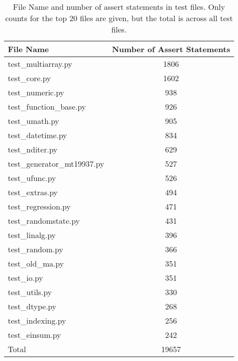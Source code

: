 \documentclass{article}
\begin{document}
\begin{table}[H]
\centering
    \begin{tabular}{lc}
        File Name & Number of Assert Statements\\\toprule
        test\_multiarray.py & 1806\\
        test\_core.py & 1602\\
        test\_numeric.py & 938\\
        test\_function\_base.py & 926\\
        test\_umath.py & 905\\
        test\_datetime.py & 834\\
        test\_nditer.py & 629\\
        test\_generator\_mt19937.py & 527\\
        test\_ufunc.py & 526\\
        test\_extras.py & 494\\
        test\_regression.py & 471\\
        test\_randomstate.py & 431\\
        test\_linalg.py & 396\\
        test\_random.py & 366\\
        test\_old\_ma.py & 351\\
        test\_io.py & 351\\
        test\_utils.py & 330\\
        test\_dtype.py & 268\\
        test\_indexing.py & 256\\
        test\_einsum.py & 242\\\bottomrule
        Total & 19657
    \end{tabular}
        \caption{File Name and number of assert statements in test files. Only counts for the top 20 files are given, but the total is across all test files.}
    \label{tbl:testasserts}
\end{table}
\end{document}
